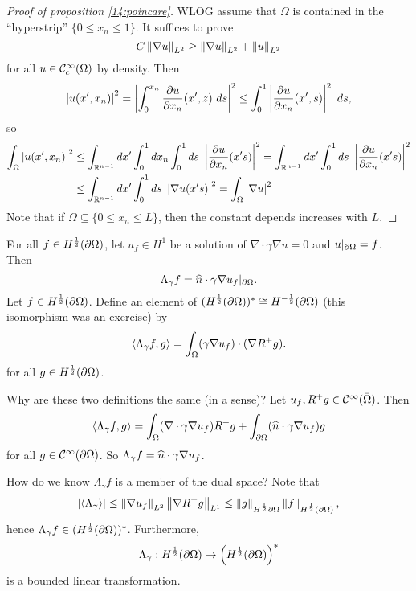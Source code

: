 \begin{proof}[Proof of proposition \ref{14:poincare}]
  WLOG assume that $\Omega$ is contained in the ``hyperstrip'' $\{0\leq x_n\leq1\}$.
  It suffices to prove
  \[ C\left\lVert \nabla u \right\rVert_{L^2} \geq \left\lVert \nabla u \right\rVert_{L^2} + \left\lVert u \right\rVert_{L^2} \]
  for all $u \in \mathcal{C}_c^\infty(\Omega)$ by density.
  Then
  \[ \left\lvert u(x',x_n) \right\rvert^2 = \left\lvert  \int_0^{x_n} \frac{\partial u}{\partial x_n}(x',z) \ ds \right\rvert^2 \leq \int_0^1 \left\lvert \frac{\partial u}{\partial x_n}(x',s) \right\rvert^2 \ ds, \]
  so
  \begin{align*}
    \int_\Omega \left\lvert u(x',x_n) \right\rvert^2 &\leq \int_{\mathbb{R}^{n-1}} dx' \int_0^1 dx_n \int_0^1 ds \ \left\lvert \frac{\partial u}{\partial x_n}(x's) \right\rvert^2 = \int_{\mathbb{R}^{n-1}} dx' \int_0^1 ds \ \left\lvert \frac{\partial u}{\partial x_n}(x's) \right\rvert^2 \\
    &\leq \int_{\mathbb{R}^{n-1}} dx' \int_0^1 ds \ \left\lvert \nabla u(x's) \right\rvert^2 = \int_\Omega \left\lvert \nabla u \right\rvert^2 
  \end{align*}
  Note that if $\Omega \subseteq \{0\leq x_n \leq L\}$, then the constant depends increases with $L$.
\end{proof}

\begin{defn}
  For all $f\in H^\frac12(\partial\Omega)$, let $u_f\in H^1$ be a solution of $\nabla\cdot\gamma\nabla u=0$ and $u|_{\partial\Omega}=f$.
  Then
  \[ \Lambda_\gamma f = \widehat n \cdot \gamma\nabla u_f|_{\partial\Omega}. \]
  Let $f\in H^\frac12(\partial\Omega)$.
  Define an element of $(H^\frac12(\partial\Omega))^* \cong H^{-\frac12}(\partial\Omega)$ (this isomorphism was an exercise) by
  \[ {\left\langle \Lambda_\gamma f,g \right\rangle} = \int_\Omega (\gamma\nabla u_f)\cdot(\nabla R^+g). \]
  for all $g\in H^\frac12(\partial\Omega)$.
\end{defn}

\begin{rmk}
  Why are these two definitions the same (in a sense)?
  Let $u_f, R^+g \in \mathcal{C}^\infty(\bar\Omega)$.
  Then
  \[ {\left\langle \Lambda_\gamma f,g \right\rangle} = \int_\Omega (\nabla\cdot\gamma\nabla u_f) R^+g + \int_{\partial\Omega} (\widehat n\cdot\gamma\nabla u_f)g \]
  for all $g\in \mathcal{C}^\infty(\partial\Omega)$.
  So $\Lambda_\gamma f = \widehat n\cdot\gamma\nabla u_f$.
\end{rmk}

\begin{rmk}
  How do we know $\Lambda_\gamma f$ is a member of the dual space?
  Note that
  \[ \left\lvert {\left\langle \Lambda_\gamma \right\rangle} \right\rvert \leq \left\lVert \nabla u_f \right\rVert_{L^2} \left\lVert \nabla R^+g \right\rVert_{L^1} \leq \left\lVert g \right\rVert_{H^\frac12{\partial\Omega}}\left\lVert f \right\rVert_{H^\frac12(\partial\Omega)}, \]
  hence $\Lambda_\gamma f \in (H^\frac12(\partial\Omega))^*$.
  Furthermore,
  \[ \Lambda_\gamma: H^\frac12(\partial\Omega) \to \left( H^\frac12(\partial\Omega) \right)^* \]
  is a bounded linear transformation.
\end{rmk}
